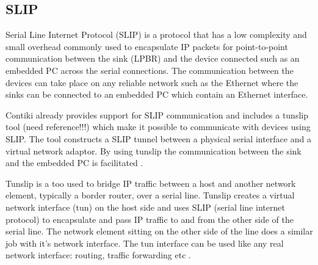 
\subsection{SLIP}
Serial Line Internet Protocol (SLIP) \cite{slip} is a protocol that has a low complexity and small overhead commonly used to encapsulate IP packets for point-to-point communication between the sink (LPBR) and the device connected such as an embedded PC across the serial connections. The communication between the devices can take place on any reliable network such as the Ethernet where the sinks can be connected to an embedded PC which contain an Ethernet interface.

Contiki already provides support for SLIP communication and includes a tunslip tool (need reference!!!) which make it possible to communicate with devices using SLIP. The tool constructs a SLIP tunnel between a physical serial interface and a virtual network adaptor. By using tunslip the communication between the sink and the embedded PC is facilitated \cite{multipleSinks}.

Tunslip is a too used to bridge IP traffic between a host and another network element, typically a border router, over a serial line. Tunslip creates a virtual network interface (tun) on the host side and uses SLIP (serial line internet protocol) to encapsulate and pass IP traffic to and from the other side of the serial line. The network element sitting on the other side of the line does a similar job with it's network interface. The tun interface can be used like any real network interface: routing, traffic forwarding etc \cite{tunslip}.


